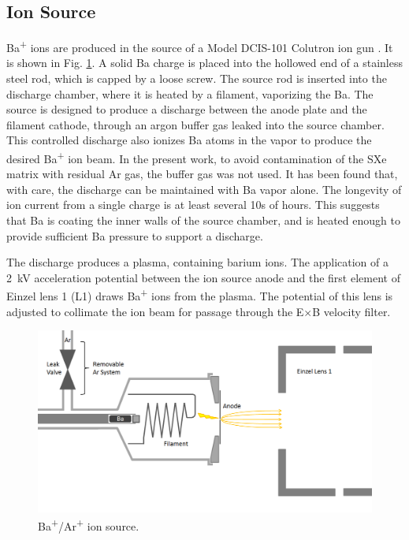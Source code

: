 \subsection{Ion Source}

Ba\textsuperscript{+} ions are produced in the source of a Model DCIS-101 Colutron ion gun \cite{Colutron}.  It is shown in Fig. \ref{fig:ionsource}.  A solid Ba charge is placed into the hollowed end of a stainless steel rod, which is capped by a loose screw.  The source rod is inserted into the discharge chamber, where it is heated by a filament, vaporizing the Ba.  The source is designed to produce a discharge between the anode plate and the filament cathode, through an argon buffer gas leaked into the source chamber.  This controlled discharge also ionizes Ba atoms in the vapor to produce the desired Ba\textsuperscript{+} ion beam.  In the present work, to avoid contamination of the SXe matrix with residual Ar gas, the buffer gas was not used.  It has been found that, with care, the discharge can be maintained with Ba vapor alone.  The longevity of ion current from a single charge is at least several 10s of hours.  This suggests that Ba is coating the inner walls of the source chamber, and is heated enough to provide sufficient Ba pressure to support a discharge.

The discharge produces a plasma, containing barium ions.  The application of a 2~kV acceleration potential between the ion source anode and the first element of Einzel lens 1 (L1) draws Ba\textsuperscript{+} ions from the plasma.  The potential of this lens is adjusted to collimate the ion beam for passage through the E$\times$B velocity filter.


\begin{figure} %
        \centering
                \includegraphics[width=.95\textwidth]{figures/ionSource.png}
                \caption{Ba\textsuperscript{+}/Ar\textsuperscript{+} ion source.}
\label{fig:ionsource}
\end{figure}

